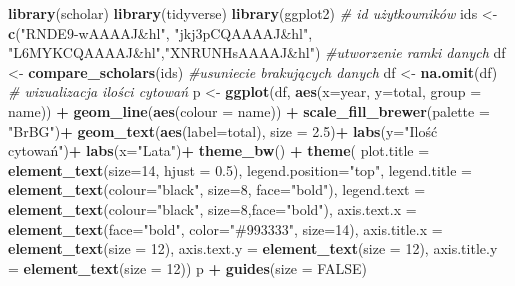 \documentclass[
  12pt,
]{article}
\newenvironment{Shaded}{\begin{snugshade}}{\end{snugshade}}
\newcommand{\AttributeTok}[1]{\textcolor[rgb]{0.13,0.29,0.53}{#1}}
\newcommand{\CommentTok}[1]{\textcolor[rgb]{0.56,0.35,0.01}{\textit{#1}}}
\newcommand{\ConstantTok}[1]{\textcolor[rgb]{0.56,0.35,0.01}{#1}}
\newcommand{\DecValTok}[1]{\textcolor[rgb]{0.00,0.00,0.81}{#1}}
\newcommand{\FloatTok}[1]{\textcolor[rgb]{0.00,0.00,0.81}{#1}}
\newcommand{\FunctionTok}[1]{\textcolor[rgb]{0.13,0.29,0.53}{\textbf{#1}}}
\newcommand{\NormalTok}[1]{#1}
\newcommand{\OtherTok}[1]{\textcolor[rgb]{0.56,0.35,0.01}{#1}}
\newcommand{\SpecialCharTok}[1]{\textcolor[rgb]{0.81,0.36,0.00}{\textbf{#1}}}
\newcommand{\StringTok}[1]{\textcolor[rgb]{0.31,0.60,0.02}{#1}}
\begin{document}
\begin{Shaded}
\begin{Highlighting}[]
\FunctionTok{library}\NormalTok{(scholar)}
\FunctionTok{library}\NormalTok{(tidyverse)}
\FunctionTok{library}\NormalTok{(ggplot2)}
\CommentTok{\# id  użytkowników}
\NormalTok{ids }\OtherTok{\textless{}{-}} \FunctionTok{c}\NormalTok{(}\StringTok{"RNDE9{-}wAAAAJ\&hl"}\NormalTok{, }\StringTok{"jkj3pCQAAAAJ\&hl"}\NormalTok{,}
         \StringTok{"L6MYKCQAAAAJ\&hl"}\NormalTok{,}\StringTok{"XNRUNHsAAAAJ\&hl"}\NormalTok{)}
\CommentTok{\#utworzenie ramki danych}
\NormalTok{df }\OtherTok{\textless{}{-}} \FunctionTok{compare\_scholars}\NormalTok{(ids)}
\CommentTok{\#usuniecie brakujących danych}
\NormalTok{df }\OtherTok{\textless{}{-}} \FunctionTok{na.omit}\NormalTok{(df)}
\CommentTok{\# wizualizacja ilości cytowań}
\NormalTok{p }\OtherTok{\textless{}{-}} \FunctionTok{ggplot}\NormalTok{(df, }\FunctionTok{aes}\NormalTok{(}\AttributeTok{x=}\NormalTok{year, }\AttributeTok{y=}\NormalTok{total, }\AttributeTok{group =}\NormalTok{ name)) }\SpecialCharTok{+} 
  \FunctionTok{geom\_line}\NormalTok{(}\FunctionTok{aes}\NormalTok{(}\AttributeTok{colour =}\NormalTok{ name)) }\SpecialCharTok{+}
  \FunctionTok{scale\_fill\_brewer}\NormalTok{(}\AttributeTok{palette =} \StringTok{"BrBG"}\NormalTok{)}\SpecialCharTok{+}
  \FunctionTok{geom\_text}\NormalTok{(}\FunctionTok{aes}\NormalTok{(}\AttributeTok{label=}\NormalTok{total), }\AttributeTok{size =} \FloatTok{2.5}\NormalTok{)}\SpecialCharTok{+}
  \FunctionTok{labs}\NormalTok{(}\AttributeTok{y=}\StringTok{"Ilość cytowań"}\NormalTok{)}\SpecialCharTok{+}
  \FunctionTok{labs}\NormalTok{(}\AttributeTok{x=}\StringTok{"Lata"}\NormalTok{)}\SpecialCharTok{+}
  \FunctionTok{theme\_bw}\NormalTok{() }\SpecialCharTok{+} 
  \FunctionTok{theme}\NormalTok{( }\AttributeTok{plot.title =} \FunctionTok{element\_text}\NormalTok{(}\AttributeTok{size=}\DecValTok{14}\NormalTok{, }\AttributeTok{hjust =} \FloatTok{0.5}\NormalTok{),}
   \AttributeTok{legend.position=}\StringTok{"top"}\NormalTok{,}
   \AttributeTok{legend.title =} \FunctionTok{element\_text}\NormalTok{(}\AttributeTok{colour=}\StringTok{"black"}\NormalTok{, }\AttributeTok{size=}\DecValTok{8}\NormalTok{, }\AttributeTok{face=}\StringTok{"bold"}\NormalTok{),}
   \AttributeTok{legend.text =} \FunctionTok{element\_text}\NormalTok{(}\AttributeTok{colour=}\StringTok{"black"}\NormalTok{, }\AttributeTok{size=}\DecValTok{8}\NormalTok{,}\AttributeTok{face=}\StringTok{"bold"}\NormalTok{),}
   \AttributeTok{axis.text.x =} \FunctionTok{element\_text}\NormalTok{(}\AttributeTok{face=}\StringTok{"bold"}\NormalTok{, }\AttributeTok{color=}\StringTok{"\#993333"}\NormalTok{, }\AttributeTok{size=}\DecValTok{14}\NormalTok{),}
   \AttributeTok{axis.title.x =} \FunctionTok{element\_text}\NormalTok{(}\AttributeTok{size =} \DecValTok{12}\NormalTok{),}
   \AttributeTok{axis.text.y =} \FunctionTok{element\_text}\NormalTok{(}\AttributeTok{size =} \DecValTok{12}\NormalTok{),}
   \AttributeTok{axis.title.y =} \FunctionTok{element\_text}\NormalTok{(}\AttributeTok{size =} \DecValTok{12}\NormalTok{))}
\NormalTok{p }\SpecialCharTok{+} \FunctionTok{guides}\NormalTok{(}\AttributeTok{size =} \ConstantTok{FALSE}\NormalTok{)}
\end{Highlighting}
\end{Shaded}
\end{document}
